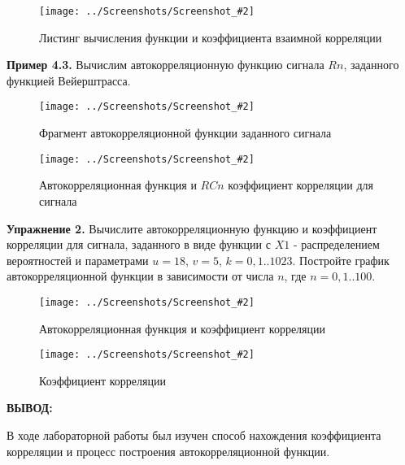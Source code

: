 \documentclass[14pt,a4paper]{extreport}
\newcommand{\sshot}[2]{\begin{figure}[ht]%
\centering\texttt{[image: ../Screenshots/Screenshot\_\#2]}%
\caption{#1}%
\label{sshot#2}%
\end{figure}%
}
\newcommand{\header}[1]{%
{
\clearpage%
\fontsize{16pt}{14pt}\selectfont
\begin{center}
\textbf{\MakeUppercase{#1}:}
\end{center}
}
}
\begin{document}
\sshot{Листинг вычисления функции и коэффициента взаимной корреляции}{2}

\clearpage

\textbf{Пример 4.3. } Вычислим автокорреляционную функцию сигнала $Rn$, заданного функцией Вейерштрасса.

\sshot{Фрагмент автокорреляционной функции заданного сигнала}{3}

\clearpage

\sshot{Автокорреляционная функция и $RCn$ коэффициент корреляции для сигнала}{4}
 
\textbf{Упражнение 2. } Вычислите автокорреляционную функцию и коэффициент корреляции для сигнала, заданного в виде функции с $X1$ - распределением вероятностей и 
параметрами $u = 18$, $v = 5$, $k = 0,1..1023$. Постройте график автокорреляционной функции в зависимости от числа $n$, где $n = 0,1..100$.

\clearpage
 
\sshot{Автокорреляционная функция и коэффициент корреляции}{5}
\sshot{Коэффициент корреляции}{6} 

\header{Вывод}

В ходе лабораторной работы был изучен способ нахождения 
коэффициента корреляции и процесс построения автокорреляционной 
функции.
\end{document}
